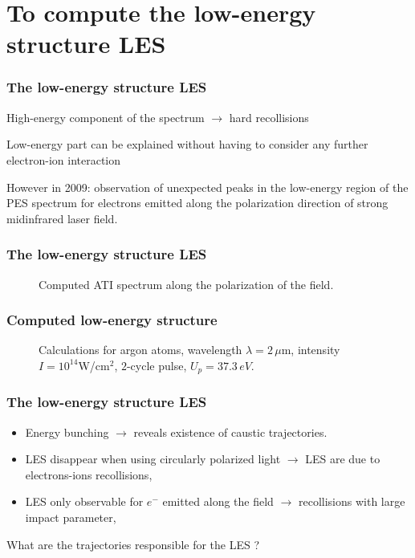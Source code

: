\documentclass{beamer}
\begin{document}
\section{To compute the low-energy structure LES}

\begin{frame}
\frametitle{The low-energy structure LES}
\begin{block}{}
High-energy component of the spectrum $\rightarrow$ hard recollisions
\end{block}
\begin{block}{}
Low-energy part can be explained without having to consider any further electron-ion interaction
\end{block}

However in 2009: observation of unexpected peaks in the low-energy region of the PES spectrum for electrons
emitted along the polarization direction of strong midinfrared laser field. 
\end{frame}

\begin{frame}
\frametitle{The low-energy structure LES}
\begin{figure}[htp]
 \resizebox{0.8\textwidth}{!}{}
 \vspace{0.5cm}
 \caption{Computed ATI spectrum along the polarization of the field.}
\end{figure}

\end{frame}


\begin{frame}
\frametitle{Computed low-energy structure}
\begin{figure}[htp]
 \resizebox{0.6\textwidth}{!}{}
  \vspace{0.25cm}
 \caption{Calculations for argon atoms, wavelength $\lambda =2\,\mu$m, intensity $I=10^{14}$W/cm$^{2}$, $2$-cycle pulse, $U_{p}=37.3\,eV$.}
\end{figure}

\end{frame}


\begin{frame}
\frametitle{The low-energy structure LES}
\begin{itemize}
\item
Energy bunching $\rightarrow$ reveals existence of caustic trajectories.
\item
LES disappear when using circularly polarized light $\rightarrow$ LES are due to electrons-ions recollisions,
\item
LES only observable for $e^{-}$ emitted along the field $\rightarrow$ recollisions with large impact parameter,
\end{itemize}
What are the trajectories responsible for the LES ?
\end{frame}
\end{document}
